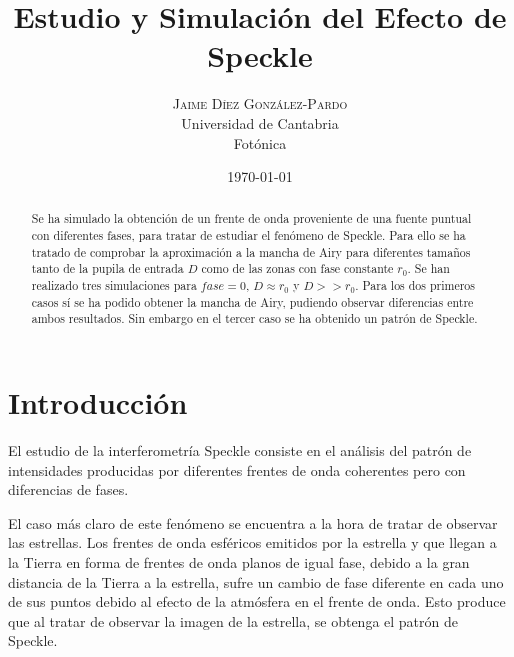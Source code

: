 \documentclass[twoside]{article}
\title{
	\vspace{-15mm}
	\fontsize{28pt}{10pt}
	\selectfont\textbf{Estudio y Simulación del Efecto de Speckle}%
}
\author{
	\large
	\textsc{Jaime D\'iez Gonz\'alez-Pardo}\\[4mm]
	\fontsize{28pt}{10pt} Universidad de Cantabria \\ %
	\normalsize Fotónica \\ 
}
\date{ \today }
\begin{document}
	\maketitle %


	\thispagestyle{fancy} %


	\begin{abstract}

		\noindent%

			Se ha simulado la obtención de un frente de onda proveniente de una fuente puntual con diferentes fases, para tratar de estudiar el fenómeno de Speckle. Para ello se ha tratado de comprobar la aproximación a la mancha de Airy para diferentes tamaños tanto de la pupila de entrada $D$ como de las zonas con fase constante $r_0$. Se han realizado tres simulaciones para $fase = 0$, $D \approx r_0$ y $D >> r_0$. Para los dos primeros casos sí se ha podido obtener la mancha de Airy, pudiendo observar diferencias entre ambos resultados. Sin embargo en el tercer caso se ha obtenido un patrón de Speckle.

	\end{abstract}


		\section{Introducción} %
							 
			El estudio de la interferometría Speckle consiste en el análisis del patrón de intensidades producidas por diferentes frentes de onda coherentes pero con diferencias de fases.

			El caso más claro de este fenómeno se encuentra a la hora de tratar de observar las estrellas. Los frentes de onda esféricos emitidos por la estrella y que llegan a la Tierra en forma de frentes de onda planos de igual fase, debido a la gran distancia de la Tierra a la estrella, sufre un cambio de fase diferente en cada uno de sus puntos debido al efecto de la atmósfera en el frente de onda. Esto produce que al tratar de observar la imagen de la estrella, se obtenga el patrón de Speckle. 	
\end{document}
